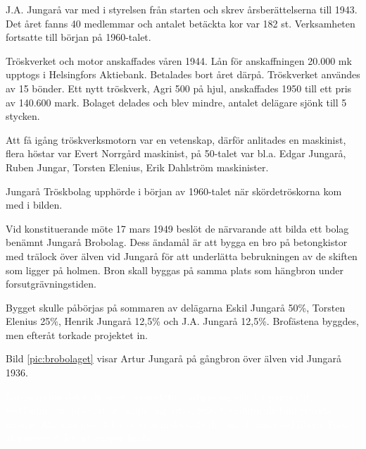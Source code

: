 J.A. Jungarå var med i styrelsen från starten och skrev årsberättelserna till 1943. Det året fanns 40 medlemmar och antalet betäckta kor var 182 st. Verksamheten fortsatte till början 	på 1960-talet.



%


Tröskverket och motor anskaffades våren 1944. Lån för anskaffningen 20.000 mk upptogs i Helsingfors Aktiebank. Betalades bort året därpå. Tröskverket användes av 15 bönder. Ett nytt tröskverk, Agri 500 på hjul, anskaffades 1950 till ett pris av 140.600 mark. Bolaget delades och blev mindre, antalet delägare sjönk till 5 stycken.

Att få igång tröskverksmotorn var en vetenskap, därför anlitades en maskinist, flera höstar var Evert Norrgård maskinist, på 50-talet var bl.a. Edgar Jungarå, Ruben Jungar, Torsten Elenius, Erik Dahlström maskinister.

Jungarå Tröskbolag upphörde i början av 1960-talet när skördetröskorna kom med i bilden.



%


Vid konstituerande möte 17 mars 1949 beslöt de närvarande att bilda ett bolag benämnt Jungarå Brobolag. Dess ändamål är att bygga en bro på betongkistor med trälock över älven vid Jungarå för att underlätta 		 bebrukningen av de skiften som ligger på holmen. Bron skall byggas på samma plats som hängbron under  forsutgrävningstiden.

Bygget skulle påbörjas på sommaren av delägarna Eskil Jungarå 50\%, Torsten Elenius 25\%, Henrik Jungarå 12,5\% och J.A. Jungarå 12,5\%. Brofästena byggdes, men efteråt torkade projektet in.

Bild \ref{pic:brobolaget} visar Artur Jungarå på gångbron över älven vid Jungarå 1936.\jhvspace[2]

\textcolor{white}{Lorem ipsum dolor sit amet, consectetuer adipiscing elit. Ut purus elit, vestibulum ut, placerat ac, adipiscing vitae, felis. Curabitur dictum gravida mauris. Aliquam quis dolor at arcu malesuada dictum sit amet sed libero. Fusce at posuere dolor, id semper ligula.} %


